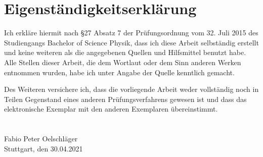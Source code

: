 \chapter{Eigenständigkeitserklärung}
Ich erkläre hiermit nach §27 Absatz 7 der Prüfungsordnung vom 32. Juli 2015 des Studiengangs
Bachelor of Science Physik, dass ich diese Arbeit selbständig erstellt und keine weiteren als die
angegebenen Quellen und Hilfsmittel benutzt habe. Alle Stellen dieser Arbeit, die dem Wortlaut
oder dem Sinn anderen Werken entnommen wurden, habe ich unter Angabe der Quelle kenntlich gemacht.

Des Weiteren versichere ich, dass die vorliegende Arbeit weder vollständig noch in Teilen
Gegenstand eines anderen Prüfungsverfahrens gewesen ist und dass das elektronische Exemplar mit
den anderen Exemplaren übereinstimmt.
\\
\\
\\
Fabio Peter Oelschläger\\
Stuttgart, den 30.04.2021
